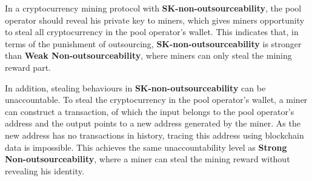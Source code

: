 In a cryptocurrency mining protocol with \textbf{SK-non-outsourceability}, the pool operator should reveal his private key to miners, which gives miners opportunity to steal all cryptocurrency in the pool operator's wallet.
This indicates that, in terms of the punishment of outsourcing, \textbf{SK-non-outsourceability} is stronger than \textbf{Weak Non-outsourceability}, where miners can only steal the mining reward part.

In addition, stealing behaviours in \textbf{SK-non-outsourceability} can be unaccountable.
To steal the cryptocurrency in the pool operator's wallet, a miner can construct a transaction, of which the input belongs to the pool operator's address and the output points to a new address generated by the miner.
As the new address has no transactions in history, tracing this address using blockchain data is impossible.
This achieves the same unaccountability level as \textbf{Strong Non-outsourceability}, where a miner can steal the mining reward without revealing his identity.





